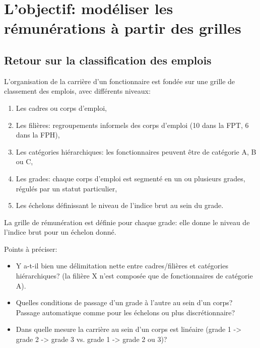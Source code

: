 \documentclass[11pt,a4paper]{article}
\begin{document}
\else \fi



\section{L'objectif: modéliser les rémunérations à partir des grilles}


\subsection*{Retour sur la classification des emplois}

L'organisation de la carrière d'un fonctionnaire est fondée sur une grille de classement des emplois, avec différents niveaux:
 
\begin{enumerate}[leftmargin=1cm ,parsep=0cm,itemsep=0cm,topsep=0cm] 
\item Les cadres ou corps d'emploi,
\item Les filières: regroupements informels des corps d'emploi (10 dans la FPT, 6 dans la FPH), 
\item Les catégories hiérarchiques: les fonctionnaires peuvent être de catégorie A, B ou C,
\item Les grades: chaque corps d'emploi est segmenté en un ou plusieurs grades, régulés par un statut particulier,
\item Les échelons définissant le niveau de l'indice brut au sein du grade. 
\end{enumerate}


\vspace{0.5cm}

La grille de rémunération est définie pour chaque grade: elle donne le niveau de l'indice brut pour un échelon donné. 

\vspace{0.5cm}


Points à préciser: 
\begin{itemize}[leftmargin=1cm ,parsep=0cm,itemsep=0cm,topsep=0cm] 
\item Y a-t-il bien une délimitation nette entre cadres/filières et catégories hiérarchiques? (la filière X n'est composée que de fonctionnaires de catégorie A). 
\item Quelles conditions de passage d'un grade à l'autre au sein d'un corps? Passage automatique comme pour les échelons ou plus discrétionnaire? %
\item Dans quelle mesure la carrière au sein d'un corps est linéaire (grade 1 -> grade 2 -> grade 3 vs. grade 1 -> grade 2 ou 3)? 
\end{itemize}
\end{document}
